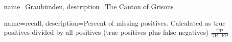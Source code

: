 \makenoidxglossaries

{
    name=Graubünden,
    description={The Canton of Grisons}
}

{
    name=recall,
    description={Percent of missing positives. 
    Calculated as true positives divided by all positives (true positives plus false negatives) $\frac{\text{TP}}{\text{TP}+\text{FP}}$}
}


